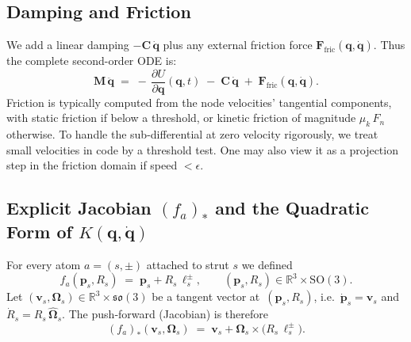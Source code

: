 \documentclass[12pt,letterpaper]{article}
\newcommand{\R}{\mathbb{R}}
\newcommand{\q}{\bm{q}}
\newcommand{\qd}{\dot{\bm{q}}}
\newcommand{\qdd}{\ddot{\bm{q}}}
\newcommand{\Mass}{\mathbf{M}}
\newcommand{\Damp}{\mathbf{C}}
\begin{document}
\subsection{Damping and Friction}
We add a linear damping $-\Damp\,\qd$ plus any external friction force $\bm{F}_{\mathrm{fric}}(\q,\qd)$.  Thus the complete second-order ODE is:
\begin{equation}
  \label{eq:final-ODE}
  \Mass\,\qdd
    \;=\;-\,\frac{\partial U}{\partial \q}(\q,t)
    \;-\;\Damp\,\qd
    \;+\;\bm{F}_{\mathrm{fric}}(\q,\qd).
\end{equation}
Friction is typically computed from the node velocities’ tangential components, with static friction if below a threshold, or kinetic friction of magnitude $\mu_k\,F_{\!n}$ otherwise. To handle the sub-differential at zero velocity rigorously, we treat small velocities in code by a threshold test. One may also view it as a projection step in the friction domain if speed $<\epsilon$.

\subsection{Explicit Jacobian \texorpdfstring{$(f_a)_{*}$}{fa-star}
         and the Quadratic Form of
         \texorpdfstring{$K(\q,\qd)$}{K(q,qdot)}}
\label{sec:jacobian-kinetic}

For every atom $a=(s,\pm)$ attached to strut $s$ we defined
\[
    f_a(\bm p_s,R_s) \;=\; \bm p_s + R_s\,\bm\ell_s^{\pm},
    \qquad
    (\bm p_s,R_s)\in\R^3\times\mathrm{SO}(3).
\]
Let $(\bm v_s,\bm\Omega_s)\in\R^3\times\mathfrak{so}(3)$ be a tangent vector
at~$(\bm p_s,R_s)$, i.e.\ $\dot{\bm p}_s=\bm v_s$ and
\(\dot{R}_s = R_s\,\widehat{\bm\Omega}_s\). The push‑forward (Jacobian) is therefore
\begin{equation}
    (f_a)_{*}(\bm v_s,\bm\Omega_s)
     \;=\;
     \bm v_s + \bm\Omega_s\times\bigl(R_s\,\bm\ell_s^{\pm}\bigr).
    \label{eq:fa-star}
\end{equation}
\end{document}
